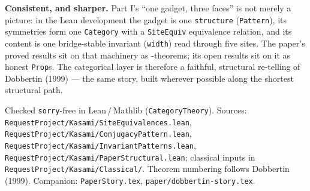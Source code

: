\documentclass[11pt]{article}
\newcommand{\code}[1]{\texttt{\small #1}}
\begin{document}
\begin{yes}
\textbf{Consistent, and sharper.} Part I's ``one gadget, three faces'' is not
merely a picture: in the Lean development the gadget is one \code{structure}
(\code{Pattern}), its symmetries form one \code{Category} with a
\code{SiteEquiv} equivalence relation, and its content is one bridge-stable
invariant (\code{width}) read through five sites. The paper's proved results sit
on that machinery as \checkmark-theorems; its open results sit on it as honest
\code{Prop}s. The categorical layer is therefore a faithful, structural
re-telling of Dobbertin (1999) --- the same story, built wherever possible along
the shortest structural path.
\end{yes}

\vfill
\begin{center}\scriptsize
Checked \code{sorry}-free in Lean\,/\,Mathlib (\code{CategoryTheory}). Sources:
\code{RequestProject/Kasami/SiteEquivalences.lean},
\code{RequestProject/Kasami/ConjugacyPattern.lean},
\code{RequestProject/Kasami/InvariantPatterns.lean},
\code{RequestProject/Kasami/PaperStructural.lean}; classical inputs in
\code{RequestProject/Kasami/Classical/}. Theorem numbering follows
Dobbertin (1999). Companion: \code{PaperStory.tex},
\code{paper/dobbertin-story.tex}.
\end{center}
\end{document}
